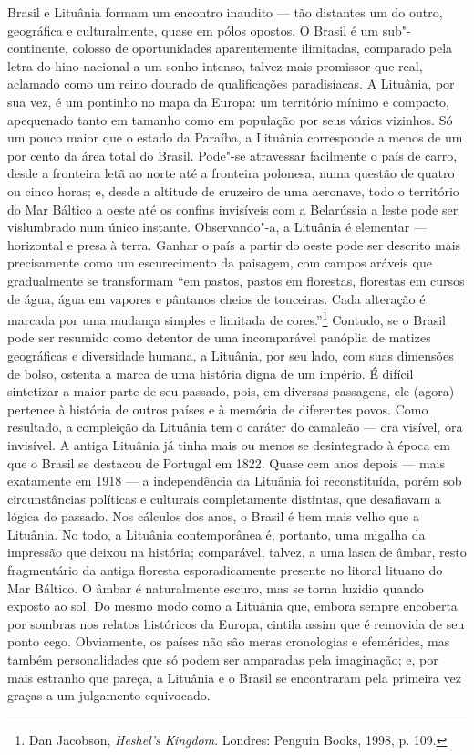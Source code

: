 \noindent{}Brasil e Lituânia formam um encontro inaudito --- tão distantes um do
outro, geográfica e culturalmente, quase em pólos opostos. O Brasil é um
sub"-continente, colosso de oportunidades aparentemente ilimitadas,
comparado pela letra do hino nacional a um sonho intenso, talvez mais
promissor que real, aclamado como um reino dourado de qualificações
paradisíacas. A Lituânia, por sua vez, é um pontinho no mapa da Europa:
um território mínimo e compacto, apequenado tanto em tamanho como em
população por seus vários vizinhos. Só um pouco maior que o estado da
Paraíba, a Lituânia corresponde a menos de um por cento da área total do
Brasil. Pode"-se atravessar facilmente o país de carro, desde a fronteira
letã ao norte até a fronteira polonesa, numa questão de quatro ou cinco
horas; e, desde a altitude de cruzeiro de uma aeronave, todo o
território do Mar Báltico a oeste até os confins invisíveis com a
Belarússia a leste pode ser vislumbrado num único instante.
Observando"-a, a Lituânia é elementar --- horizontal e presa à terra.
Ganhar o país a partir do oeste pode ser descrito mais precisamente como
um escurecimento da paisagem, com campos aráveis que gradualmente se
transformam ``em pastos, pastos em florestas, florestas em cursos de
água, água em vapores e pântanos cheios de touceiras. Cada alteração é
marcada por uma mudança simples e limitada de cores.''\footnote{Dan Jacobson, \textit{Heshel's Kingdom}. Londres: Penguin Books, 1998, p. 109.}
Contudo, se o Brasil pode ser resumido como detentor de uma incomparável
panóplia de matizes geográficas e diversidade humana, a Lituânia, por
seu lado, com suas dimensões de bolso, ostenta a marca de uma história
digna de um império. É difícil sintetizar a maior parte de seu passado,
pois, em diversas passagens, ele (agora) pertence à história de outros
países e à memória de diferentes povos. Como resultado, a compleição da
Lituânia tem o caráter do camaleão --- ora visível, ora invisível. A
antiga Lituânia já tinha mais ou menos se desintegrado à época em que o
Brasil se destacou de Portugal em 1822. Quase cem anos depois --- mais
exatamente em 1918 --- a independência da Lituânia foi reconstituída,
porém sob circunstâncias políticas e culturais completamente distintas,
que desafiavam a lógica do passado. Nos cálculos dos anos, o Brasil é
bem mais velho que a Lituânia. No todo, a Lituânia contemporânea é,
portanto, uma migalha da impressão que deixou na história; comparável,
talvez, a uma lasca de âmbar, resto fragmentário da antiga floresta
esporadicamente presente no litoral lituano do Mar Báltico. O âmbar é
naturalmente escuro, mas se torna luzidio quando exposto ao sol. Do
mesmo modo como a Lituânia que, embora sempre encoberta por sombras nos
relatos históricos da Europa, cintila assim que é removida de seu ponto
cego. Obviamente, os países não são meras cronologias e efemérides, mas
também personalidades que só podem ser amparadas pela imaginação; e, por
mais estranho que pareça, a Lituânia e o Brasil se encontraram pela
primeira vez graças a um julgamento equivocado.

